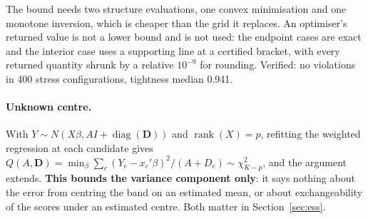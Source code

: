 The bound needs two structure evaluations, one convex minimisation and one
monotone inversion, which is cheaper than the grid it replaces. An optimiser's returned
value is not a lower bound and is not used: the endpoint cases are exact and the
interior case uses a supporting line at a certified bracket, with every returned
quantity shrunk by a relative $10^{-9}$ for rounding. Verified: no violations in
400 stress configurations, tightness median 0.941.

\paragraph{Unknown centre.} With $Y\sim N(X\beta,AI+\operatorname{diag}(\mathbf
D))$ and $\operatorname{rank}(X)=p$, refitting the weighted regression at each
candidate gives $Q(A,\mathbf D)=\min_\beta\sum_c(Y_c-x_c'\beta)^2/(A+D_c)\sim
\chi^2_{K-p}$, and the argument extends. \textbf{This bounds the variance
component only}: it says nothing about the error from centring the band on an
estimated mean, or about exchangeability of the scores under an estimated centre.
Both matter in Section~\ref{sec:ess}.
